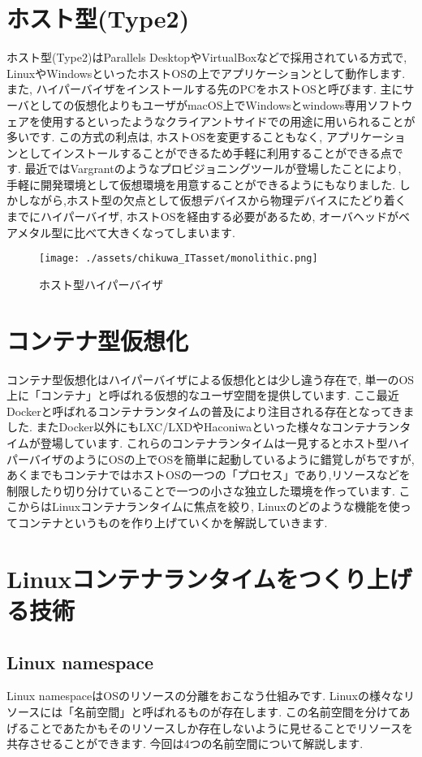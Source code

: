 \section{ホスト型(Type2)}
ホスト型(Type2)はParallels DesktopやVirtualBoxなどで採用されている方式で, LinuxやWindowsといったホストOSの上でアプリケーションとして動作します. また, ハイパーバイザをインストールする先のPCをホストOSと呼びます. 主にサーバとしての仮想化よりもユーザがmacOS上でWindowsとwindows専用ソフトウェアを使用するといったようなクライアントサイドでの用途に用いられることが多いです. この方式の利点は, ホストOSを変更することもなく, アプリケーションとしてインストールすることができるため手軽に利用することができる点です. 最近ではVargrantのようなプロビジョニングツールが登場したことにより, 手軽に開発環境として仮想環境を用意することができるようにもなりました. しかしながら,ホスト型の欠点として仮想デバイスから物理デバイスにたどり着くまでにハイパーバイザ, ホストOSを経由する必要があるため, オーバヘッドがベアメタル型に比べて大きくなってしまいます.
\begin{figure}[htbp]
    \centering
    \texttt{[image: ./assets/chikuwa\_ITasset/monolithic.png]}
    \caption{ホスト型ハイパーバイザ}
    \label{fig:hosthypervisor}
\end{figure}
\section{コンテナ型仮想化}
コンテナ型仮想化はハイパーバイザによる仮想化とは少し違う存在で, 単一のOS上に「コンテナ」と呼ばれる仮想的なユーザ空間を提供しています. ここ最近Dockerと呼ばれるコンテナランタイムの普及により注目される存在となってきました. またDocker以外にもLXC/LXDやHaconiwaといった様々なコンテナランタイムが登場しています. これらのコンテナランタイムは一見するとホスト型ハイパーバイザのようにOSの上でOSを簡単に起動しているように錯覚しがちですが, あくまでもコンテナではホストOSの一つの「プロセス」であり,リソースなどを制限したり切り分けていることで一つの小さな独立した環境を作っています. ここからはLinuxコンテナランタイムに焦点を絞り, Linuxのどのような機能を使ってコンテナというものを作り上げていくかを解説していきます.
\section{Linuxコンテナランタイムをつくり上げる技術}
\subsection{Linux namespace}
Linux namespaceはOSのリソースの分離をおこなう仕組みです. Linuxの様々なリソースには「名前空間」と呼ばれるものが存在します. この名前空間を分けてあげることであたかもそのリソースしか存在しないように見せることでリソースを共存させることができます. 今回は4つの名前空間について解説します.
